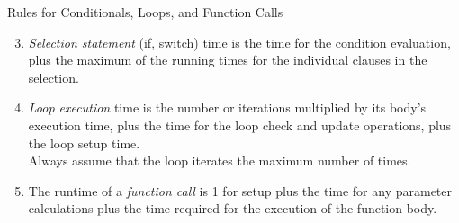 \documentclass[14pt,aspectratio=1610, hyperref={pdfpagelayout=SinglePage}]{beamer}
\begin{document}
\begin{frame}{Rules for Conditionals, Loops, and Function Calls}
\begin{enumerate}[<+->]
\setcounter{enumi}{2}
\item
  \emph{Selection statement} (if, switch) time is the time for the condition evaluation, plus the maximum of the running times for the individual clauses in the selection.
\item
  \emph{Loop execution} time is the number or iterations multiplied by its body's execution time, plus the time for the loop check and update operations, plus the loop setup time.\\
  Always assume that the loop iterates the maximum number of times.
\item
  The runtime of a \emph{function call} is 1 for setup plus the time for any parameter calculations plus the time required for the execution of the function body.
\end{enumerate}
\end{frame}
\end{document}

